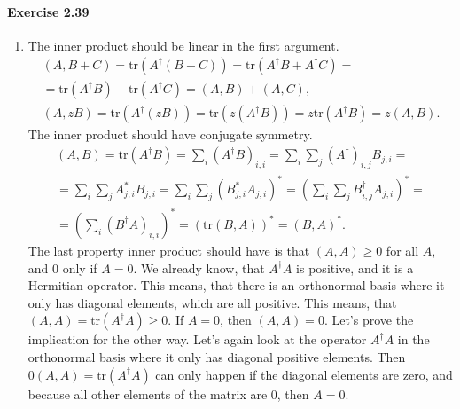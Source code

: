 \documentclass[a4paper,12pt]{article}
\newcommand{\exercise}[1]{\paragraph{Exercise #1}}
\begin{document}
    \exercise{2.39}
    \begin{enumerate}[label=(\roman*)]

        \item The inner product should be linear in the first argument.
            \begin{gather}
                \nonumber
                (A, B + C) = \textrm{tr}(A^\dagger (B+C)) = \textrm{tr}(A^\dagger B + A^\dagger C) =\\
                \nonumber
                = \textrm{tr}(A^\dagger B) + \textrm{tr}(A^\dagger C) = (A, B) + (A, C) \textrm{,}\\
                (A, zB) = \textrm{tr}(A^\dagger (zB)) = \textrm{tr}(z(A^\dagger B)) = z \textrm{tr}(A^\dagger B) = z(A, B) \textrm{.}
            \end{gather}
            The inner product should have conjugate symmetry.
            \begin{gather}
                \nonumber
                (A, B) = \textrm{tr}(A^\dagger B) = \sum_i (A^\dagger B)_{i, i} = \sum_i \sum_j (A^\dagger)_{i, j} B_{j, i} =\\
                \nonumber
                = \sum_i \sum_j A^*_{j, i} B_{j, i} = \sum_i \sum_j (B^*_{j, i} A_{j, i}) ^ * = \left( \sum_i \sum_j B^\dagger_{i, j} A_{j, i} \right)^* =\\
                = \left( \sum_i (B^\dagger A)_{i, i} \right)^* = (\textrm{tr}(B, A))^* = (B, A)^* \textrm{.}
            \end{gather}
            The last property inner product should have is that $(A, A) \ge 0$ for all $A$, and 0 only if $A = 0$. We already know, that $A^\dagger A$ is positive, and it is a Hermitian operator. This means, that there is an orthonormal basis where it only has diagonal elements, which are all positive. This means, that $(A, A) = \textrm{tr}(A^\dagger A) \ge 0$. If $A = 0$, then $(A, A) = 0$. Let's prove the implication for the other way. Let's again look at the operator $A^\dagger A$ in the orthonormal basis where it only has diagonal positive elements. Then $0 (A, A) = \textrm{tr}(A^\dagger A)$ can only happen if the diagonal elements are zero, and because all other elements of the matrix are 0, then $A = 0$.


\end{enumerate}
\end{document}
